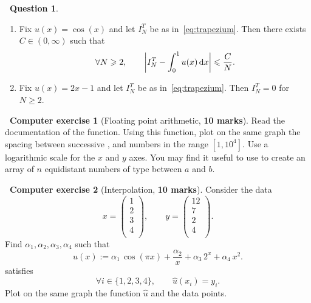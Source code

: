 \documentclass[11pt]{article}
\theoremstyle{definition}
\newtheorem{question}{{\normalfont \faGears}~Question}
\newtheorem{compexercise}{{\normalfont \faLaptop}~Computer exercise}
\renewcommand{\mymarks}[1]{\textbf{#1 marks}}
\begin{document}
\begin{question}
\begin{enumerate}
        \item
            Fix $u(x) = \cos(x)$ and let $I^T_N$ be as in~\eqref{eq:trapezium}.
            Then there exists $C \in (0, \infty)$ such that
            \[
                \forall N \geqslant 2, \qquad
                \left\lvert I^T_N - \int_{0}^1 u(x) \, \mathrm d x \right\rvert \leqslant \frac{C}{N}.
            \]

        \item
            Fix $u(x) = 2x - 1$ and let $I^T_N$ be as in~\eqref{eq:trapezium}.
            Then $I^T_N = 0$ for $N \geq 2$.
    \end{enumerate}
\end{question}

\newpage

\begin{compexercise}
    [Floating point arithmetic, \mymarks{10}]
    Read the documentation of the  function.
    Using this function,
    plot on the same graph the spacing between successive ,  and  numbers in the range $[1, 10^4]$.
    Use a logarithmic scale for the $x$ and $y$ axes.
    You may find it useful to use 
    to create an array of $n$ equidistant numbers of type  between $a$ and $b$.
\end{compexercise}

\begin{compexercise}
    [Interpolation, \mymarks{10}]
    Consider the data
    \[
        x =
        \begin{pmatrix}
            1 \\
            2 \\
            3 \\
            4 \\
        \end{pmatrix},
        \qquad
        y =
        \begin{pmatrix}
            12 \\
            7 \\
            2 \\
            4 \\
        \end{pmatrix}.
    \]
    Find $\alpha_1, \alpha_2, \alpha_3, \alpha_4$ such that
    \[
        \widehat u(x) := \alpha_1 \, \cos(\pi x) + \frac{\alpha_2}{x} + \alpha_3 \, 2^x + \alpha_4 \, x^2.
    \]
    satisfies
    \[
        \forall i \in \{1, 2, 3, 4\}, \qquad
        \widehat u(x_i) = y_i.
    \]
    Plot on the same graph the function $\widehat u$ and the data points.
\end{compexercise}
\end{document}
